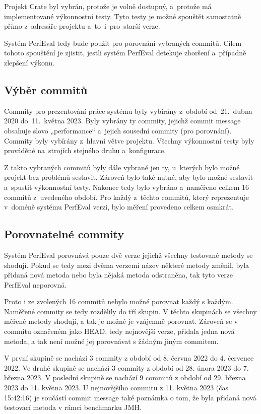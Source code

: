 Projekt Crate byl vybrán, protože je volně dostupný, a~protože má implementované výkonnostní testy.
Tyto testy je možné spouštět samostatně přímo z~adresáře projektu a~to~i~pro~starší verze.

Systém PerfEval tedy bude použit pro porovnání vybraných commitů. Cílem tohoto
spouštění je zjistit, jestli systém PerfEval detekuje zhoršení a~případně zlepšení
výkonu.

\subsection{Výběr commitů}

Commity pro prezentování práce systému byly vybírány z~období od~21.~dubna 2020 do~11.~května 2023.
Byly vybrány ty commity, jejichž commit message obsahuje slovo „performance“ a~jejich sousední commity (pro porovnání).
Commity byly vybírány z~hlavní větve projektu. Všechny výkonnostní testy byly prováděné na~strojích stejného druhu a~konfigurace.

Z takto vybraných commitů byly dále vybrané jen ty, u~kterých bylo možné projekt bez problémů sestavit. Zároveň bylo také nutné,
aby bylo možné sestavit a~spustit výkonnostní testy. Nakonec tedy bylo vybráno a~naměřeno celkem 16 commitů z~uvedeného období.
Pro každý z~těchto commitů, který reprezentuje v~doméně systému PerfEval verzi, bylo měření provedeno celkem osmkrát.

\subsection{Porovnatelné commity}

Systém PerfEval porovnává pouze dvě verze jejichž všechny testované metody se shodují. Pokud se tedy mezi dvěma
verzemi název některé metody změnil, byla přidaná nová metoda nebo byla nějaká metoda odstraněna, tak tyto verze
PerfEval neporovná.

Proto i ze zvolených 16 commitů nebylo možné porovnat každý s každým. Naměřené commity se tedy rozdělily do tří skupin.
V těchto skupinách se všechny měřené metody shodují, a tak je možné je vzájemně porovnat. Zároveň se v commitu
označeném jako HEAD, tedy nejnovější verze, přidala jedna nová metoda, a tak není možné jej porovnávat s žádným jiným commitem.

V první skupině se nachází 3 commity z období od 8. června 2022 do 4. července 2022.
Ve druhé skupině se nachází 3 commity z období od 28. února 2023 do 7. března 2023.
V poslední skupině se nachází 9 commitů z období od 29. března 2023 do 11. května 2023.
U nejnovějšího commitu z 11. května 2023 (čas 15:42:16) je součástí commit message také poznámka o tom,
že byla přidaná nová testovací metoda v rámci benchmarku JMH.

